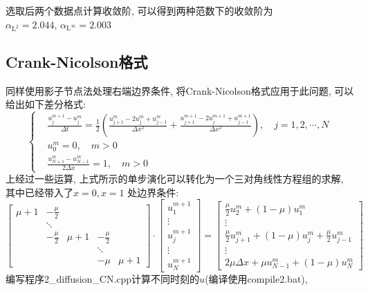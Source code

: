 \documentclass[a4paper,zihao=5,UTF8]{ctexart}
\newcommand{\mr}[1]{\mathrm{#1}}
\begin{document}
	选取后两个数据点计算收敛阶, 可以得到两种范数下的收敛阶为$\alpha_{\mr{L}^{2}} = 2.044,\,\alpha_{\mr{L}^{\infty}} = 2.003$

	\subsection{Crank-Nicolson格式}
	同样使用影子节点法处理右端边界条件, 将Crank-Nicolson格式应用于此问题, 可以给出如下差分格式:
	\begin{equation}
		\left\{
			\begin{aligned}
				&\frac{u_j^{m+1} - u_j^m}{\Delta t} = \frac{1}{2}\left(\frac{u_{j+1}^m - 2u_j^{m} + u_{j-1}^{m}}{\Delta x^2} + \frac{u_{j+1}^{m+1} - 2u_{j}^{m+1} + u_{j-1}^{m+1}}{\Delta x^2}\right), \quad j = 1, 2,\cdots, N\\
				&u_0^m = 0,\quad m > 0\\
				&\frac{u_{N+1}^m - u_{N-1}^{m}}{2\Delta x} = 1, \quad m > 0
			\end{aligned}
		\right.
	\end{equation}
	上经过一些运算, 上式所示的单步演化可以转化为一个三对角线性方程组的求解, 其中已经带入了$x=0, x=1$
	处边界条件:
	\begin{equation}
		\begin{bmatrix}
			\mu + 1 & -\frac{\mu}{2} & & & \\
			 & \ddots & & & \\
			 & -\frac{\mu}{2} & \mu + 1 & -\frac{\mu}{2} & \\
			 & & & \ddots & \\
			 & & & -\mu & \mu + 1
		\end{bmatrix}
		\cdot
		\begin{bmatrix}
			u_1^{m+1} \\
			\vdots\\
			u_j^{m+1}\\
			\vdots\\
			u_{N}^{m+1}
		\end{bmatrix}
		=
		\begin{bmatrix}
			\frac{\mu}{2}u_2^m + (1-\mu)u_1^m\\
			\vdots \\
			\frac{\mu}{2}u_{j+1}^m + (1-\mu)u_j^m + \frac{\mu}{2}u_{j-1}^m\\
			\vdots \\
			2\mu\Delta x + \mu u_{N-1}^m + (1-\mu)u_{N}^m
		\end{bmatrix}
	\end{equation}
	编写程序2\_diffusion\_CN.cpp计算不同时刻的$u$(编译使用compile2.bat),
\end{document}
